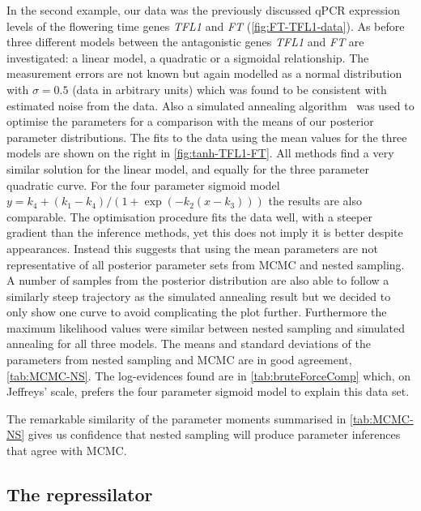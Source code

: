 In the second example, our data was the previously discussed qPCR expression levels of the flowering time genes \emph{TFL1} and \emph{FT} (\autoref{fig:FT-TFL1-data}).
As before three different models between the antagonistic genes \emph{TFL1} and \emph{FT} are investigated: a linear model, a quadratic or a sigmoidal relationship. 
The measurement errors are not known but again modelled as a normal distribution with $\sigma = 0.5$ (data in arbitrary units) which was found to be consistent with estimated noise from the data.
Also a simulated annealing algorithm~\cite{kirkpatrick1983,goffe1994} was used to optimise the parameters for a comparison with the means of our posterior parameter distributions.
The fits to the data using the mean values for the three models are shown on the right in \autoref{fig:tanh-TFL1-FT}.
All methods find a very similar solution for the linear model, and equally for the three parameter quadratic curve.
For the four parameter sigmoid model $y = k_4 + (k_1-k_4)/(1+\exp(-k_2(x-k_3)))$ the results are also comparable.
The optimisation procedure fits the data well, with a steeper gradient than the inference methods, yet this does not imply it is better despite appearances.
Instead this suggests that using the mean parameters are not representative of all posterior parameter sets from MCMC and nested sampling.
A number of samples from the posterior distribution are also able to follow a similarly steep trajectory as the simulated annealing result but we decided to only show one curve to avoid complicating the plot further.
Furthermore the maximum likelihood values were similar between nested sampling and simulated annealing for all three models.
The means and standard deviations of the parameters from nested sampling and MCMC are in good agreement, \autoref{tab:MCMC-NS}.
The log-evidences found are in \autoref{tab:bruteForceComp} which, on Jeffreys' scale, prefers the four parameter sigmoid model to explain this data set.

The remarkable similarity of the parameter moments summarised in \autoref{tab:MCMC-NS} gives us confidence that nested sampling will produce parameter inferences that agree with MCMC.

\subsection{The repressilator}


